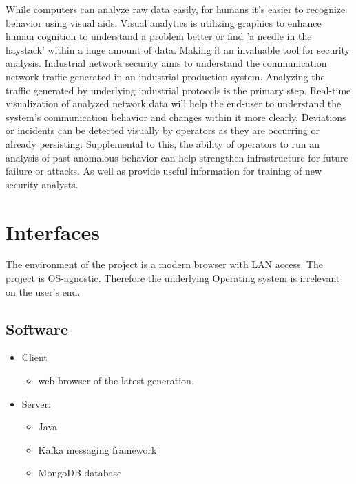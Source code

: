 \documentclass[twoside, english, final]{Pflichtenheft}
\begin{document}
While computers can analyze raw data easily, for humans it's easier to recognize behavior using visual aids.
Visual analytics is utilizing graphics to enhance human cognition to understand a problem better or find 'a needle in the haystack' within a huge amount of data. Making it an invaluable tool for security analysis.
\newline
\newline
Industrial network security aims to understand the communication network traffic generated in an industrial production system. Analyzing the traffic generated by underlying industrial protocols is the primary step.
\newline
\newline
Real-time visualization of analyzed network data will help the end-user to understand the system's communication behavior and changes within it more clearly. Deviations or incidents can be detected visually by operators as they are occurring or already persisting.\newline
\newline
Supplemental to this, the ability of operators to run an analysis of past anomalous behavior can help strengthen infrastructure for future failure or attacks. As well as provide useful information for training of new security analysts.
\newpage
\section{Interfaces}


The environment of the project is a modern browser with LAN access. The project is OS-agnostic. Therefore the underlying Operating system is irrelevant on the user's end.


\subsection{Software}
\begin{itemize}
	\item{Client}
	      \begin{itemize}
		      \item{web-browser of the latest generation.}
	      \end{itemize}

	\item{Server:}
	      \begin{itemize}
		      \item{Java}
		      \item{Kafka messaging framework}
		      \item{MongoDB database}
	      \end{itemize}
\end{itemize}
\end{document}
